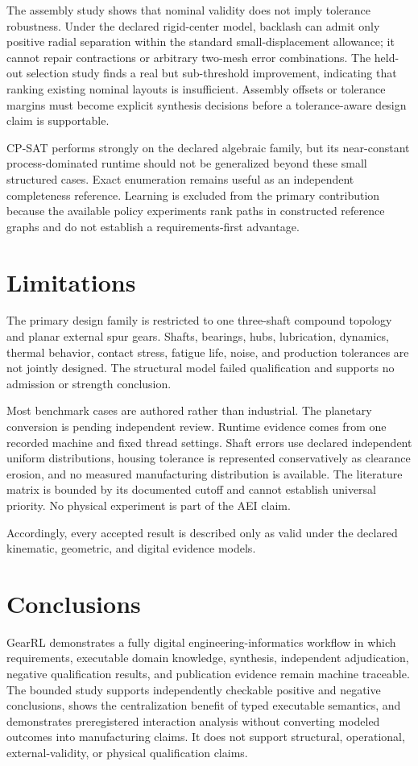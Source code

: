 \documentclass[preprint,12pt]{elsarticle}
\begin{document}
The assembly study shows that nominal validity does not imply tolerance robustness. Under the declared rigid-center model, backlash can admit only positive radial separation within the standard small-displacement allowance; it cannot repair contractions or arbitrary two-mesh error combinations. The held-out selection study finds a real but sub-threshold improvement, indicating that ranking existing nominal layouts is insufficient. Assembly offsets or tolerance margins must become explicit synthesis decisions before a tolerance-aware design claim is supportable.

CP-SAT performs strongly on the declared algebraic family, but its near-constant process-dominated runtime should not be generalized beyond these small structured cases. Exact enumeration remains useful as an independent completeness reference. Learning is excluded from the primary contribution because the available policy experiments rank paths in constructed reference graphs and do not establish a requirements-first advantage.

\section{Limitations}
The primary design family is restricted to one three-shaft compound topology and planar external spur gears. Shafts, bearings, hubs, lubrication, dynamics, thermal behavior, contact stress, fatigue life, noise, and production tolerances are not jointly designed. The structural model failed qualification and supports no admission or strength conclusion.

Most benchmark cases are authored rather than industrial. The planetary conversion is pending independent review. Runtime evidence comes from one recorded machine and fixed thread settings. Shaft errors use declared independent uniform distributions, housing tolerance is represented conservatively as clearance erosion, and no measured manufacturing distribution is available. The literature matrix is bounded by its documented cutoff and cannot establish universal priority. No physical experiment is part of the AEI claim.

Accordingly, every accepted result is described only as valid under the declared kinematic, geometric, and digital evidence models.

\section{Conclusions}
GearRL demonstrates a fully digital engineering-informatics workflow in which requirements, executable domain knowledge, synthesis, independent adjudication, negative qualification results, and publication evidence remain machine traceable. The bounded study supports independently checkable positive and negative conclusions, shows the centralization benefit of typed executable semantics, and demonstrates preregistered interaction analysis without converting modeled outcomes into manufacturing claims. It does not support structural, operational, external-validity, or physical qualification claims.
\end{document}
